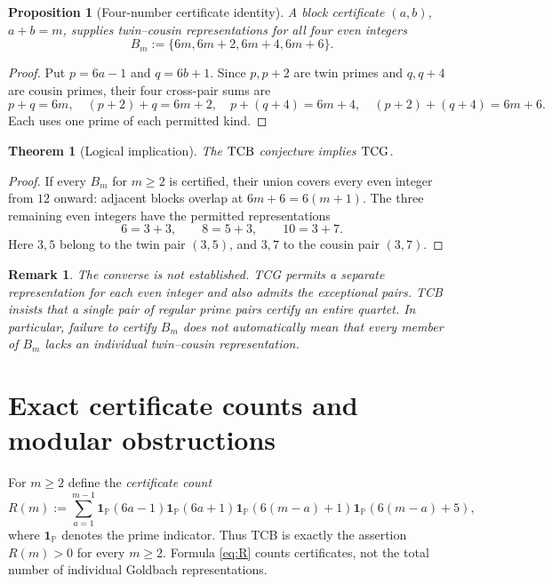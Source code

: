 \documentclass[11pt,a4paper]{article}
\numberwithin{equation}{section}
\newtheorem{theorem}[conjecture]{Theorem}
\newtheorem{proposition}[conjecture]{Proposition}
\newtheorem{remark}[conjecture]{Remark}
\theoremstyle{definition}
\newcommand{\PP}{\mathbb P}
\newcommand{\TCG}{\textup{TCG}}
\newcommand{\TCB}{\textup{TCB}}
\newcommand{\one}{\mathbf{1}}
\begin{document}
\begin{proposition}[Four-number certificate identity]\label{prop:quartet}
A block certificate \((a,b)\), \(a+b=m\), supplies twin--cousin representations for all four even integers
\begin{equation}\label{eq:block}
B_m:=\{6m,6m+2,6m+4,6m+6\}.
\end{equation}
\end{proposition}
\begin{proof}
Put \(p=6a-1\) and \(q=6b+1\). Since \(p,p+2\) are twin primes and \(q,q+4\) are cousin primes, their four cross-pair sums are
\[
p+q=6m,\quad (p+2)+q=6m+2,\quad p+(q+4)=6m+4,\quad (p+2)+(q+4)=6m+6.
\]
Each uses one prime of each permitted kind.
\end{proof}
\begin{theorem}[Logical implication]\label{thm:implication}
The \(\TCB\) conjecture implies \(\TCG\).
\end{theorem}
\begin{proof}
If every \(B_m\) for \(m\ge2\) is certified, their union covers every even integer from \(12\) onward: adjacent blocks overlap at \(6m+6=6(m+1)\). The three remaining even integers have the permitted representations
\[
6=3+3,\qquad 8=5+3,\qquad 10=3+7.
\]
Here \(3,5\) belong to the twin pair \((3,5)\), and \(3,7\) to the cousin pair \((3,7)\).
\end{proof}
\begin{remark}
The converse is \emph{not established}. TCG permits a separate representation for each even integer and also admits the exceptional pairs. TCB insists that a single pair of regular prime pairs certify an entire quartet. In particular, failure to certify \(B_m\) does not automatically mean that every member of \(B_m\) lacks an individual twin--cousin representation.
\end{remark}

\section{Exact certificate counts and modular obstructions}
For \(m\ge2\) define the \emph{certificate count}
\begin{equation}\label{eq:R}
R(m):=\sum_{a=1}^{m-1}\one_{\PP}(6a-1)\one_{\PP}(6a+1)
\one_{\PP}(6(m-a)+1)\one_{\PP}(6(m-a)+5),
\end{equation}
where \(\one_{\PP}\) denotes the prime indicator. Thus TCB is exactly the assertion \(R(m)>0\) for every \(m\ge2\). Formula \eqref{eq:R} counts certificates, not the total number of individual Goldbach representations.
\end{document}
